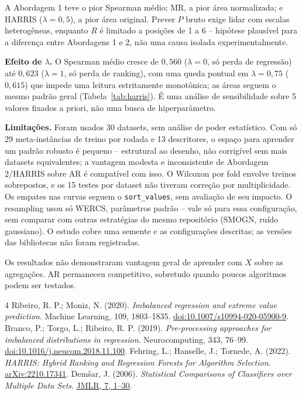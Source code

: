 \documentclass[10pt]{article}
\begin{document}
A Abordagem 1 teve o pior Spearman médio; MR, a pior área normalizada; e
HARRIS ($\lambda=0{,}5$), a pior área original. Prever $P$ bruto exige lidar
com escalas heterogêneas, enquanto $R$ é limitado a posições de 1 a 6 --
hipótese plausível para a diferença entre Abordagens 1 e 2, não uma causa
isolada experimentalmente.

\textbf{Efeito de $\lambda$.} O Spearman médio cresce de $0{,}560$
($\lambda=0$, só perda de regressão) até $0{,}623$ ($\lambda=1$, só perda
de ranking), com uma queda pontual em $\lambda=0{,}75$ ($0{,}615$) que
impede uma leitura estritamente monotônica; as áreas seguem o mesmo padrão
geral (Tabela~\ref{tab:harris}). É uma análise de sensibilidade sobre 5
valores fixados a priori, não uma busca de hiperparâmetro.

\textbf{Limitações.} Foram usados 30 datasets, sem análise de poder
estatístico. Com só 29 meta-instâncias de treino por rodada e 13
descritores, o espaço para aprender um padrão robusto é pequeno --
estrutural ao desenho, não corrigível sem mais datasets equivalentes; a
vantagem modesta e inconsistente de Abordagem 2/HARRIS sobre AR é
compatível com isso. O Wilcoxon por fold envolve treinos sobrepostos, e os
15 testes por dataset não tiveram correção por multiplicidade. Os empates
nas curvas seguem o \texttt{sort\_values}, sem avaliação de seu impacto. O
resampling usou só WERCS, parâmetros padrão -- vale só para essa
configuração, sem comparar com outras estratégias do mesmo repositório
(SMOGN, ruído gaussiano). O estudo cobre uma semente e as configurações
descritas; as versões das bibliotecas não foram registradas.

Os resultados não demonstraram vantagem geral de aprender com $X$
sobre as agregações. AR permaneceu competitivo, sobretudo quando
poucos algoritmos podem ser testados.

\begingroup
\small
\begin{thebibliography}{4}
\setlength{\itemsep}{0pt}
 Ribeiro, R. P.; Moniz, N. (2020).
\emph{Imbalanced regression and extreme value prediction}.
Machine Learning, 109, 1803--1835.
\href{https://doi.org/10.1007/s10994-020-05900-9}{doi:10.1007/s10994-020-05900-9}.
 Branco, P.; Torgo, L.; Ribeiro, R. P. (2019).
\emph{Pre-processing approaches for imbalanced distributions in regression}.
Neurocomputing, 343, 76--99.
\href{https://doi.org/10.1016/j.neucom.2018.11.100}{doi:10.1016/j.neucom.2018.11.100}.
 Fehring, L.; Hanselle, J.; Tornede, A. (2022).
\emph{HARRIS: Hybrid Ranking and Regression Forests for Algorithm Selection}.
\href{https://arxiv.org/abs/2210.17341}{arXiv:2210.17341}.
 Demšar, J. (2006).
\emph{Statistical Comparisons of Classifiers over Multiple Data Sets}.
\href{https://www.jmlr.org/papers/v7/demsar06a.html}{JMLR, 7, 1--30}.
\end{thebibliography}
\endgroup
\end{document}
